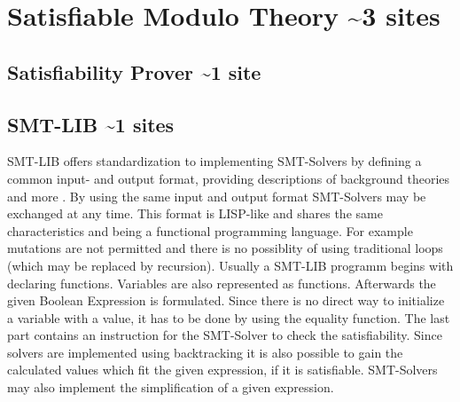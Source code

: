 \section{Satisfiable Modulo Theory \textasciitilde 3 sites}
\subsection{Satisfiability Prover \textasciitilde 1 site}
\subsection{SMT-LIB \textasciitilde 1 sites}
SMT-LIB offers standardization to implementing SMT-Solvers by defining a common input- and output format, providing descriptions of background theories and more \cite{cokSMTLIBv2LanguageTools}. %
By using the same input and output format SMT-Solvers may be exchanged at any time. 
This format is LISP-like and shares the same characteristics and being a functional programming language. 
For example mutations are not permitted and there is no possiblity of using traditional loops (which may be replaced by recursion).
Usually a SMT-LIB programm begins with declaring functions. Variables are also represented as functions. 
Afterwards the given Boolean Expression is formulated. Since there is no direct way to initialize a variable with a value, it has to be done by using the equality function. 
The last part contains an instruction for the SMT-Solver to check the satisfiability. 
Since solvers are implemented using backtracking it is also possible to gain the calculated values which fit the given expression, if it is satisfiable. 
SMT-Solvers may also implement the simplification of a given expression.
